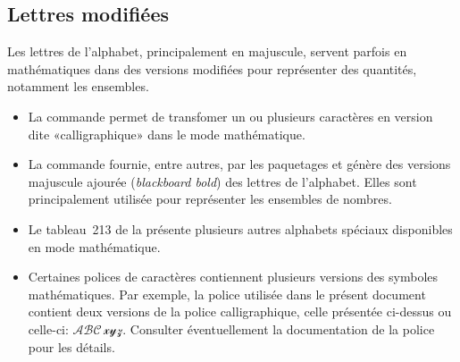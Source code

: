 \subsection{Lettres modifiées}
\label{tab:math:symboles:mathcal}

Les lettres de l'alphabet, principalement en majuscule, servent
parfois en mathématiques dans des versions modifiées pour représenter
des quantités, notamment les ensembles.

\begin{itemize}
\item La commande \cmd{\mathcal} permet de transfomer un ou plusieurs
  caractères en version dite «calligraphique» dans le mode mathématique.
\item La commande \cmd{\mathbb} fournie, entre autres, par les
  paquetages  et  génère des versions
  majuscule ajourée (\emph{blackboard bold}) des lettres de
  l'alphabet. Elles sont principalement utilisée pour représenter les
  ensembles de nombres.
\item Le tableau~213 de la %
  présente plusieurs autres alphabets spéciaux disponibles en
  mode mathématique.
\item Certaines polices de caractères contiennent plusieurs versions
  des symboles mathématiques. Par exemple, la police utilisée dans le
  présent document contient deux versions de la police calligraphique,
  celle présentée ci-dessus ou celle-ci: %
  $\mathscr{ABC\, xyz}$.
  Consulter éventuellement la documentation de la police pour les détails.
\end{itemize}

